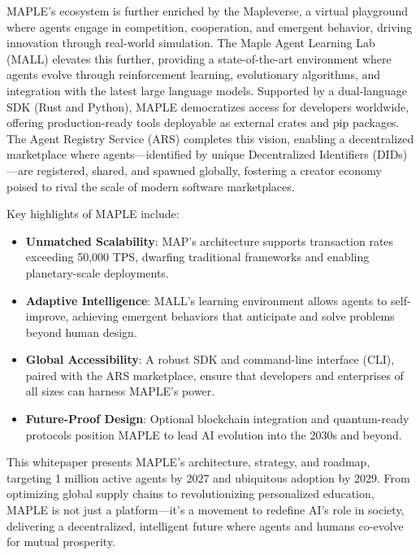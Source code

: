 \documentclass[a4paper,11pt]{article}
\begin{document}
MAPLE’s ecosystem is further enriched by the Mapleverse, a virtual playground where agents engage in competition, cooperation, and emergent behavior, driving innovation through real-world simulation. The Maple Agent Learning Lab (MALL) elevates this further, providing a state-of-the-art environment where agents evolve through reinforcement learning, evolutionary algorithms, and integration with the latest large language models. Supported by a dual-language SDK (Rust and Python), MAPLE democratizes access for developers worldwide, offering production-ready tools deployable as external crates and pip packages. The Agent Registry Service (ARS) completes this vision, enabling a decentralized marketplace where agents—identified by unique Decentralized Identifiers (DIDs)—are registered, shared, and spawned globally, fostering a creator economy poised to rival the scale of modern software marketplaces.

Key highlights of MAPLE include:
\begin{itemize}[leftmargin=*]
    \item \textbf{Unmatched Scalability}: MAP’s architecture supports transaction rates exceeding 50,000 TPS, dwarfing traditional frameworks and enabling planetary-scale deployments.
    \item \textbf{Adaptive Intelligence}: MALL’s learning environment allows agents to self-improve, achieving emergent behaviors that anticipate and solve problems beyond human design.
    \item \textbf{Global Accessibility}: A robust SDK and command-line interface (CLI), paired with the ARS marketplace, ensure that developers and enterprises of all sizes can harness MAPLE’s power.
    \item \textbf{Future-Proof Design}: Optional blockchain integration and quantum-ready protocols position MAPLE to lead AI evolution into the 2030s and beyond.
\end{itemize}

This whitepaper presents MAPLE’s architecture, strategy, and roadmap, targeting 1 million active agents by 2027 and ubiquitous adoption by 2029. From optimizing global supply chains to revolutionizing personalized education, MAPLE is not just a platform—it’s a movement to redefine AI’s role in society, delivering a decentralized, intelligent future where agents and humans co-evolve for mutual prosperity.

\pagebreak
\end{document}
